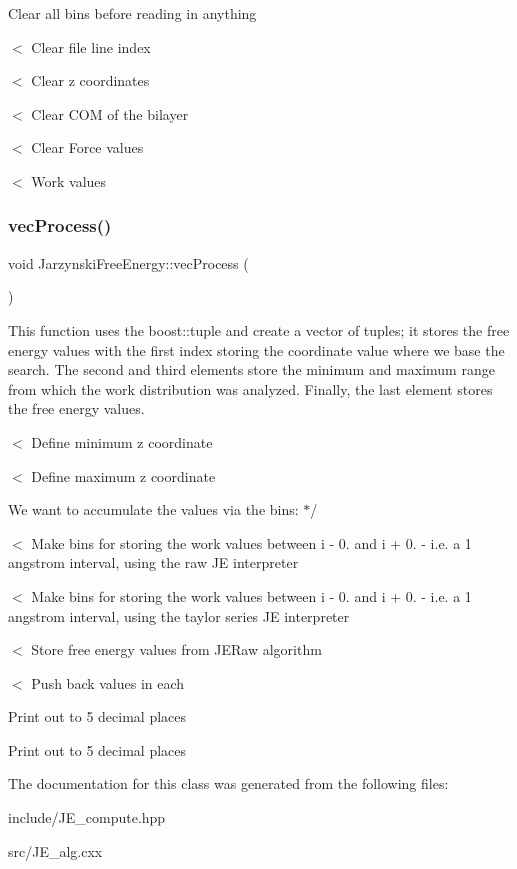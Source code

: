 Clear all bins before reading in anything

$<$ Clear file line index

$<$ Clear z coordinates

$<$ Clear C\+OM of the bilayer

$<$ Clear Force values

$<$ Work values \mbox{\label{classJarzynskiFreeEnergy_a7765d4e262c6705461d9eb9e1ac0f502}} 
\subsubsection{\texorpdfstring{vec\+Process()}{vecProcess()}}
{\footnotesize\ttfamily void Jarzynski\+Free\+Energy\+::vec\+Process (\begin{DoxyParamCaption}{ }\end{DoxyParamCaption})}

This function uses the boost\+::tuple and create a vector of tuples; it stores the free energy values with the first index storing the coordinate value where we base the search. The second and third elements store the minimum and maximum range from which the work distribution was analyzed. Finally, the last element stores the free energy values.

$<$ Define minimum z coordinate

$<$ Define maximum z coordinate

We want to accumulate the values via the bins\+: $\ast$/

$<$ Make bins for storing the work values between i -\/ 0. and i + 0. -\/ i.\+e. a 1 angstrom interval, using the raw JE interpreter

$<$ Make bins for storing the work values between i -\/ 0. and i + 0. -\/ i.\+e. a 1 angstrom interval, using the taylor series JE interpreter

$<$ Store free energy values from J\+E\+Raw algorithm

$<$ Push back values in each

Print out to 5 decimal places

Print out to 5 decimal places 

The documentation for this class was generated from the following files\+:\begin{DoxyCompactItemize}
\item 
include/J\+E\+\_\+compute.\+hpp\item 
src/J\+E\+\_\+alg.\+cxx\end{DoxyCompactItemize}

